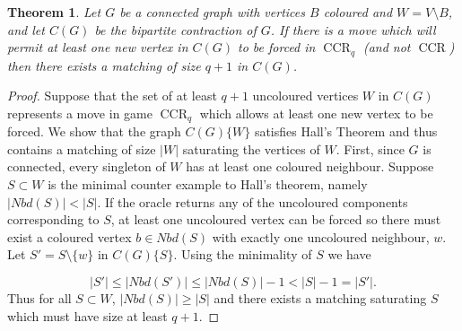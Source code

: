 \documentclass[3p,times,12pt]{article}
\newtheorem{theorem}{Theorem}[section]
\newtheorem{question}[theorem]{Question}
\DeclareMathOperator{\CCR}{CCR}
\begin{document}
\begin{theorem}\label{thm_necessary}
  Let $G$ be a connected graph with vertices $B$ coloured and $W=V\setminus B$, and let $C(G)$ be the bipartite contraction of $G$. If there is a move which will permit at least one new vertex in $C(G)$ to be forced in $\CCR_{q}$ (and not $\CCR$) then there exists a matching of size $q+1$ in $C(G)$.
\end{theorem}
\begin{proof}
 Suppose that the set of at least $q+1$ uncoloured vertices $W$ in $C(G)$ represents a move in game $\CCR_q$ which allows at least one new vertex to be forced. We show that the graph $C(G)\{W\}$ satisfies Hall's Theorem and thus contains a matching of size $|W|$ saturating the vertices of $W$.  First, since $G$ is connected, every singleton of $W$ has at least one coloured neighbour.  Suppose  $S \subset W$ is the minimal counter example to Hall's theorem, namely $|Nbd(S)| < |S|.$
    If the oracle returns any of the uncoloured components corresponding to $S$, at least one uncoloured vertex can be forced so there must exist a coloured vertex $b \in Nbd(S)$ with exactly one uncoloured neighbour, $w$.  Let $S' = S \setminus \{w\}$ in $C(G)\{S\}$.  Using the minimality of $S$ we have

    \[
      |S'| \leq |Nbd(S')| \leq |Nbd(S)| -1 < |S| -1 = |S'|.
    \]
    Thus for all $S \subset W$,
   $ |Nbd(S)| \geq |S|$
  and there exists a matching saturating $S$ which must have size at least $q+1$.
\end{proof}

%
\end{document}
